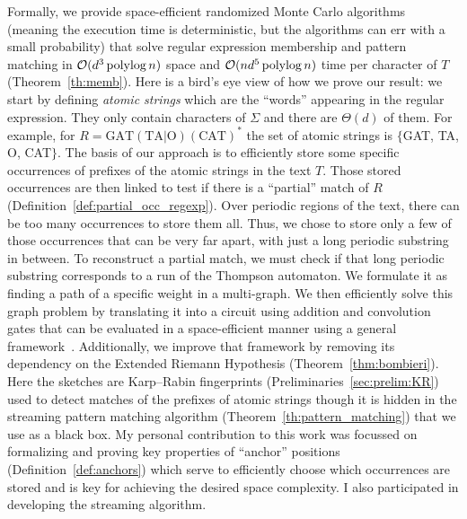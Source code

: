Formally, we provide space-efficient randomized Monte Carlo algorithms (meaning the execution time is deterministic, but the algorithms can err with a small probability) that solve regular expression membership and pattern matching in $\mathcal{O}(d^3\operatorname{polylog} n)$ space and $\mathcal{O}(nd^5\operatorname{polylog} n)$ time per character of $T$ (Theorem~\ref{th:memb}).
%
Here is a bird's eye view of how we prove our result: we start by defining \emph{atomic strings} which are the ``words'' appearing in the regular expression. They only contain characters of $\Sigma$ and there are $\Theta(d)$ of them. For example, for $R= \mathrm{GAT}(\mathrm{TA} | \mathrm{O})(\mathrm{CAT})^*$  the set of atomic strings is $\{$GAT, TA, O, CAT$\}$.
%
The basis of our approach is to efficiently store some specific occurrences of prefixes of the atomic strings in the text $T$. Those stored occurrences are then linked to test if there is a “partial” match of $R$ (Definition~\ref*{def:partial_occ_regexp}).
Over periodic regions of the text, there can be too many occurrences to store them all.
Thus, we chose to store only a few of those occurrences that can be very far apart, with just a long periodic substring in between. To reconstruct a partial match, we must check if that long periodic substring corresponds to a run of the Thompson automaton. We formulate it as finding a path of a specific weight in a multi-graph. We then efficiently solve this graph problem by translating it into a circuit using addition and convolution gates that can be evaluated in a space-efficient manner using a general framework~\cite{LokshtanovN10,Bringmann17}. Additionally, we improve that framework by removing its dependency on the Extended Riemann Hypothesis (Theorem~\ref{thm:bombieri}). 
Here the sketches are Karp--Rabin fingerprints (Preliminaries~\ref{sec:prelim:KR}) used to detect matches of the prefixes of atomic strings though it is hidden in the streaming pattern matching algorithm (Theorem~\ref{th:pattern_matching}) that we use as a black box.
My personal contribution to this work was focussed on formalizing and proving key properties of ``anchor'' positions (Definition~\ref{def:anchors}) which serve to efficiently choose which occurrences are stored and is key for achieving the desired space complexity. I also participated in developing the streaming algorithm. %



